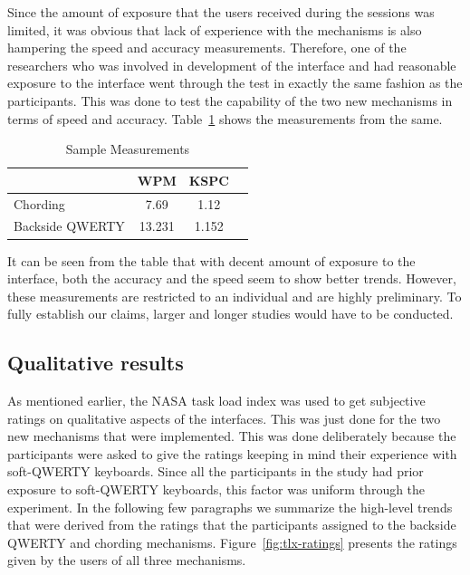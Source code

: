 Since the amount of exposure that the users received during the
sessions was limited, it was obvious that lack of experience with the
mechanisms is also hampering the speed and accuracy
measurements. Therefore, one of the researchers who was involved in
development of the interface and had reasonable exposure to the
interface went through the test in exactly the same fashion as the
participants. This was done to test the capability of the two new
mechanisms in terms of speed and
accuracy. Table~\ref{tab:StatisticsForTestCorpora} shows the
measurements from the same.

\begin{table}
	\centering
		\begin{tabular}{|l|c|c|c|} \hline
		                         & WPM & KSPC \\ \hline
			 Chording & 7.69 & 1.12 \\ \hline
			 Backside QWERTY & 13.231 & 1.152 \\ \hline
		\end{tabular}
	\caption{Sample Measurements}
	\label{tab:StatisticsForTestCorpora}
\end{table}

It can be seen from the table that with decent amount of exposure to
the interface, both the accuracy and the speed seem to show better
trends. However, these measurements are restricted to an individual
and are highly preliminary. To fully establish our claims, larger and
longer studies would have to be conducted.

\subsection{Qualitative results}

As mentioned earlier, the NASA task load index was used to get
subjective ratings on qualitative aspects of the interfaces. This was
just done for the two new mechanisms that were implemented. This was
done deliberately because the participants were asked to give the
ratings keeping in mind their experience with soft-QWERTY
keyboards. Since all the participants in the study had prior exposure
to soft-QWERTY keyboards, this factor was uniform through the
experiment. In the following few paragraphs we summarize the
high-level trends that were derived from the ratings that the
participants assigned to the backside QWERTY and chording
mechanisms. Figure~\ref{fig:tlx-ratings} presents the ratings given by
the users of all three mechanisms.

